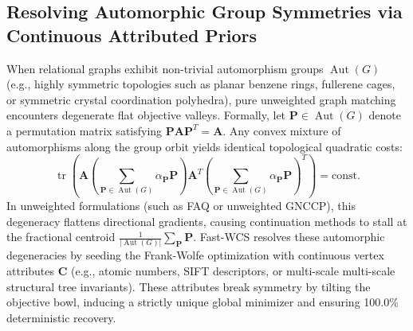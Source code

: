 \documentclass[a4paper,fleqn]{cas-dc}
\theoremstyle{thmstyleone}
\theoremstyle{thmstyletwo}
\theoremstyle{thmstylethree}
\begin{document}
\subsection{Resolving Automorphic Group Symmetries via Continuous Attributed Priors}
When relational graphs exhibit non-trivial automorphism groups $\operatorname{Aut}(G)$ (e.g., highly symmetric topologies such as planar benzene rings, fullerene cages, or symmetric crystal coordination polyhedra), pure unweighted graph matching encounters degenerate flat objective valleys. Formally, let $\mathbf{P} \in \operatorname{Aut}(G)$ denote a permutation matrix satisfying $\mathbf{P} \mathbf{A} \mathbf{P}^T = \mathbf{A}$. Any convex mixture of automorphisms along the group orbit yields identical topological quadratic costs:
\begin{equation}
\operatorname{tr}\left( \mathbf{A} \left( \sum_{\mathbf{P} \in \operatorname{Aut}(G)} \alpha_{\mathbf{P}} \mathbf{P} \right) \mathbf{A}^T \left( \sum_{\mathbf{P} \in \operatorname{Aut}(G)} \alpha_{\mathbf{P}} \mathbf{P} \right)^T \right) = \text{const}.
\end{equation}
In unweighted formulations (such as FAQ or unweighted GNCCP), this degeneracy flattens directional gradients, causing continuation methods to stall at the fractional centroid $\frac{1}{|\operatorname{Aut}(G)|}\sum_{\mathbf{P}} \mathbf{P}$. Fast-WCS resolves these automorphic degeneracies by seeding the Frank-Wolfe optimization with continuous vertex attributes $\mathbf{C}$ (e.g., atomic numbers, SIFT descriptors, or multi-scale multi-scale structural tree invariants). These attributes break symmetry by tilting the objective bowl, inducing a strictly unique global minimizer and ensuring 100.0\% deterministic recovery.
\end{document}
